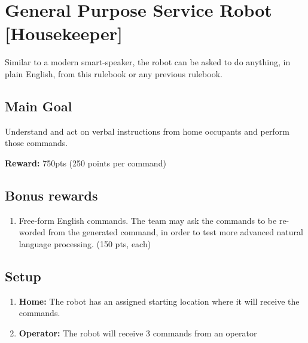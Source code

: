 \section{General Purpose Service Robot [Housekeeper]}
Similar to a modern smart-speaker, the robot can be asked to do anything, in plain English, from this rulebook or any previous rulebook.


\subsection{Main Goal}
Understand and act on verbal instructions from home occupants and perform those commands.

\noindent\textbf{Reward:} 750pts (250 points per command)\\

\subsection{Bonus rewards}
\begin{enumerate}[nosep]
	\item Free-form English commands. The team may ask the commands to be re-worded from the generated command, in order to test more advanced natural language processing. (150 pts, each)
\end{enumerate}

%
%
\subsection{Setup}
\begin{enumerate}
	\item \textbf{Home:} The robot has an assigned starting location where it will receive the commands.
	\item \textbf{Operator:} The robot will receive 3 commands from an operator
\end{enumerate}

%
%

